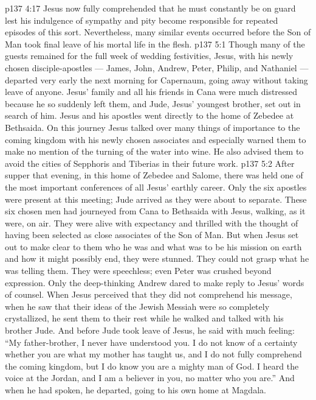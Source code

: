 \vs p137 4:17 Jesus now fully comprehended that he must constantly be on guard lest his indulgence of sympathy and pity become responsible for repeated episodes of this sort. Nevertheless, many similar events occurred before the Son of Man took final leave of his mortal life in the flesh.
\vs p137 5:1 Though many of the guests remained for the full week of wedding festivities, Jesus, with his newly chosen disciple\hyp{}apostles --- James, John, Andrew, Peter, Philip, and Nathaniel --- departed very early the next morning for Capernaum, going away without taking leave of anyone. Jesus’ family and all his friends in Cana were much distressed because he so suddenly left them, and Jude, Jesus’ youngest brother, set out in search of him. Jesus and his apostles went directly to the home of Zebedee at Bethsaida. On this journey Jesus talked over many things of importance to the coming kingdom with his newly chosen associates and especially warned them to make no mention of the turning of the water into wine. He also advised them to avoid the cities of Sepphoris and Tiberias in their future work.
\vs p137 5:2 After supper that evening, in this home of Zebedee and Salome, there was held one of the most important conferences of all Jesus’ earthly career. Only the six apostles were present at this meeting; Jude arrived as they were about to separate. These six chosen men had journeyed from Cana to Bethsaida with Jesus, walking, as it were, on air. They were alive with expectancy and thrilled with the thought of having been selected as close associates of the Son of Man. But when Jesus set out to make clear to them who he was and what was to be his mission on earth and how it might possibly end, they were stunned. They could not grasp what he was telling them. They were speechless; even Peter was crushed beyond expression. Only the deep\hyp{}thinking Andrew dared to make reply to Jesus’ words of counsel. When Jesus perceived that they did not comprehend his message, when he saw that their ideas of the Jewish Messiah were so completely crystallized, he sent them to their rest while he walked and talked with his brother Jude. And before Jude took leave of Jesus, he said with much feeling: “My father\hyp{}brother, I never have understood you. I do not know of a certainty whether you are what my mother has taught us, and I do not fully comprehend the coming kingdom, but I do know you are a mighty man of God. I heard the voice at the Jordan, and I am a believer in you, no matter who you are.” And when he had spoken, he departed, going to his own home at Magdala.
